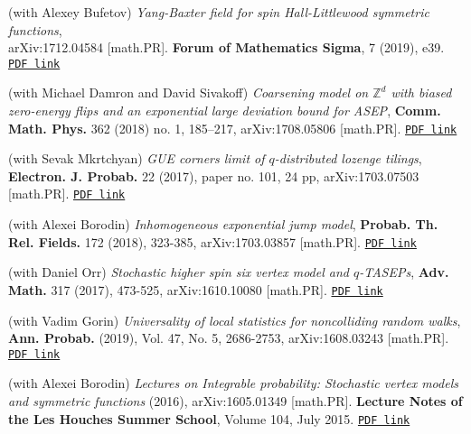 \documentclass[letterpaper,11pt]{article}
\begin{document}
\begin{etaremune}
	\item (with Alexey Bufetov)
		\emph{Yang-Baxter field for spin Hall-Littlewood symmetric functions},\\
		arXiv:1712.04584 [math.PR]. \textbf{Forum of Mathematics Sigma}, 7 (2019), e39.
		\href{https://storage.lpetrov.cc/research_files/Petrov-publ/27-publ-petrov-uva.pdf}{\texttt{PDF link}}
	\item
	      (with Michael Damron and David Sivakoff) \emph{Coarsening model
		      on $\mathbb{Z}^d$ with biased zero-energy flips and an exponential large
			deviation bound for ASEP}, 
			\textbf{Comm. Math. Phys.} 362 (2018) no. 1, 185–217, 
			arXiv:1708.05806 [math.PR].
		\href{https://storage.lpetrov.cc/research_files/Petrov-publ/26-publ-petrov-uva.pdf}{\texttt{PDF link}}
	\item
	      (with Sevak Mkrtchyan)
	      \emph{GUE corners limit of $q$-distributed lozenge tilings},
				\textbf{Electron. J. Probab.} 22 (2017), paper no. 101, 24 pp,
				arXiv:1703.07503 [math.PR].
		\href{https://storage.lpetrov.cc/research_files/Petrov-publ/25-publ-petrov-uva.pdf}{\texttt{PDF link}}
	\item
	      (with Alexei Borodin)
		\emph{Inhomogeneous exponential jump model},
		\textbf{Probab. Th. Rel. Fields.} 
		172 (2018), 323-385,
		arXiv:1703.03857 [math.PR]. 
		\href{https://storage.lpetrov.cc/research_files/Petrov-publ/24-publ-petrov-uva-j.pdf}{\texttt{PDF link}}
	\item
	      (with Daniel Orr)
	      \emph{Stochastic higher spin six vertex model and $q$-TASEPs},
				\textbf{Adv. Math.} 317 (2017), 473-525, arXiv:1610.10080
	      [math.PR].
		\href{https://storage.lpetrov.cc/research_files/Petrov-publ/23-publ-petrov-uva.pdf}{\texttt{PDF link}}
			\item 
	      (with Vadim Gorin)
	      \emph{Universality of local statistics for noncolliding random
		      walks}, \textbf{Ann. Probab.} (2019), Vol. 47, No. 5, 2686-2753,
				arXiv:1608.03243 [math.PR]. 
		\href{https://storage.lpetrov.cc/research_files/Petrov-publ/22-publ-petrov-uva.pdf}{\texttt{PDF link}}
	\item
	      (with Alexei Borodin)
	      \emph{Lectures on Integrable probability: Stochastic vertex
		      models and symmetric functions}
	      (2016), arXiv:1605.01349 [math.PR]. \textbf{Lecture Notes of the Les
				Houches Summer School}, Volume 104, July 2015.
		\href{https://storage.lpetrov.cc/research_files/Petrov-publ/21-publ-petrov-uva.pdf}{\texttt{PDF link}}
	\item

\end{etaremune}
\end{document}
